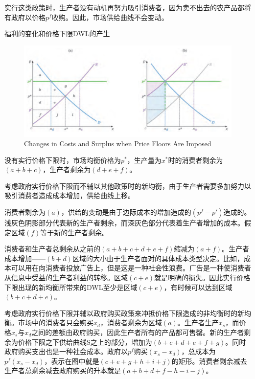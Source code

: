 \documentclass{article}
\begin{document}
实行这类政策时，生产者没有动机再努力吸引消费者，因为卖不出去的农产品都将有政府以价格$ p^f $收购。因此，市场供给曲线不会变动。

\hspace*{\fill}

福利的变化和价格下限DWL的产生

\begin{figure}[H] %
	\centering %
	\includegraphics[width=1\textwidth]{18_6} %
	\caption{Changes in Costs and Surplus when Price Floors Are Imposed} %
	\label{Fig.main7} %
\end{figure}

没有实行价格下限时，市场均衡价格为$ p^* $，生产量为$ x^* $时的消费者剩余为$ (a+b+c) $，生产者剩余为$ (d+e+f) $。

考虑政府实行价格下限而不辅以其他政策时的新均衡，由于生产者需要多加努力以吸引消费者造成成本增加，供给曲线上移。


消费者剩余为$ (a) $，供给的变动是由于边际成本的增加造成的$ (p^f-p') $造成的。浅灰色阴影部分代表新的生产者剩余，而深灰色部分代表着生产者增加的成本。假定区域$ (f) $等于新的生产者剩余。

消费者和生产者总剩余从之前的$ (a+b+c+d+e+f) $缩减为$ (a+f) $。生产者成本增加——$ (b+d) $区域的大小由于生产者面对的具体成本类型决定。比如，成本可以用在向消费者投放广告上，但是这是一种社会性浪费。广告是一种使消费者从信息中受益的生产者利益的转移。区域$ (c+e) $就是明确的损失。因此实行价格下限出现的新均衡所带来的DWL至少是区域$ (c+e) $，有时候可以达到区域$ (b+c+d+e) $。

考虑政府实行价格下限并辅以政府购买政策来冲抵价格下限造成的非均衡时的新均衡。市场中的消费者只会购买$ x_d $，消费者剩余为区域$ (a) $。生产者生产$ x_s $，而价格$ x_s $与$ x_d $之间的差额由政府购买，因此生产者所有的产品都可售罄。新的生产者剩余为价格下限之下供给曲线S之上的部分，增加为$ (b+c+d+e+f+g) $。同时政府购买支出也是一种社会成本。政府以$ p^f $购买$ (x_s-x_d) $，总成本为$ p^f(x_s-x_d) $，表示在图中就是$ (c+e+g+h+i+j) $的矩形。消费者剩余减去生产者总剩余减去政府购买的升本就是$ (a+b+d+f-h-i-j) $。
\end{document}
